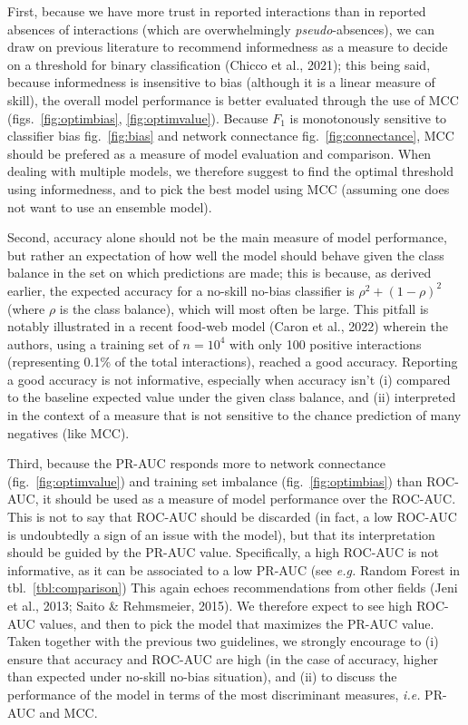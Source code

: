 \documentclass[10pt,oneside]{article}
\begin{document}
First, because we have more trust in reported interactions than in
reported absences of interactions (which are overwhelmingly
\emph{pseudo}-absences), we can draw on previous literature to recommend
informedness as a measure to decide on a threshold for binary
classification (Chicco et al., 2021); this being said, because
informedness is insensitive to bias (although it is a linear measure of
skill), the overall model performance is better evaluated through the
use of MCC (figs.~\ref{fig:optimbias}, \ref{fig:optimvalue}). Because
\(F_1\) is monotonously sensitive to classifier bias fig.~\ref{fig:bias}
and network connectance fig.~\ref{fig:connectance}, MCC should be
prefered as a measure of model evaluation and comparison. When dealing
with multiple models, we therefore suggest to find the optimal threshold
using informedness, and to pick the best model using MCC (assuming one
does not want to use an ensemble model).

Second, accuracy alone should not be the main measure of model
performance, but rather an expectation of how well the model should
behave given the class balance in the set on which predictions are made;
this is because, as derived earlier, the expected accuracy for a
no-skill no-bias classifier is \(\rho^2 + (1-\rho)^2\) (where \(\rho\)
is the class balance), which will most often be large. This pitfall is
notably illustrated in a recent food-web model (Caron et al., 2022)
wherein the authors, using a training set of \(n = 10^4\) with only 100
positive interactions (representing 0.1\% of the total interactions),
reached a good accuracy. Reporting a good accuracy is not informative,
especially when accuracy isn't (i) compared to the baseline expected
value under the given class balance, and (ii) interpreted in the context
of a measure that is not sensitive to the chance prediction of many
negatives (like MCC).

Third, because the PR-AUC responds more to network connectance
(fig.~\ref{fig:optimvalue}) and training set imbalance
(fig.~\ref{fig:optimbias}) than ROC-AUC, it should be used as a measure
of model performance over the ROC-AUC. This is not to say that ROC-AUC
should be discarded (in fact, a low ROC-AUC is undoubtedly a sign of an
issue with the model), but that its interpretation should be guided by
the PR-AUC value. Specifically, a high ROC-AUC is not informative, as it
can be associated to a low PR-AUC (see \emph{e.g.} Random Forest in
tbl.~\ref{tbl:comparison}) This again echoes recommendations from other
fields (Jeni et al., 2013; Saito \& Rehmsmeier, 2015). We therefore
expect to see high ROC-AUC values, and then to pick the model that
maximizes the PR-AUC value. Taken together with the previous two
guidelines, we strongly encourage to (i) ensure that accuracy and
ROC-AUC are high (in the case of accuracy, higher than expected under
no-skill no-bias situation), and (ii) to discuss the performance of the
model in terms of the most discriminant measures, \emph{i.e.} PR-AUC and
MCC.
\end{document}
